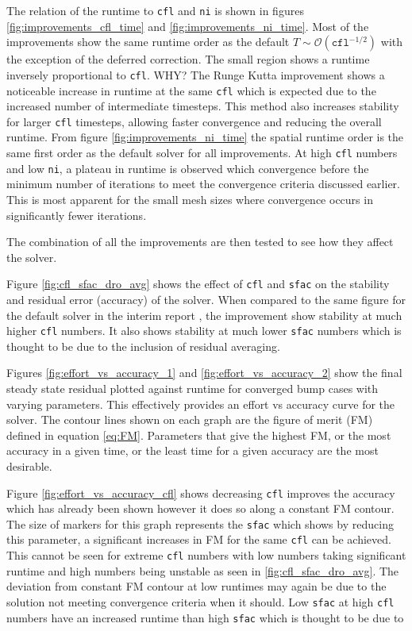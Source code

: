 \documentclass{article}
\begin{document}
The relation of the runtime to \texttt{cfl} and \texttt{ni} is shown in figures \ref{fig:improvements_cfl_time} and \ref{fig:improvements_ni_time}.
Most of the improvements show the same runtime order as the default $T\sim\mathcal{O}(\texttt{cfl}^{-1/2})$ with the exception of the deferred correction.
The small region shows a runtime inversely proportional to \texttt{cfl}. WHY? %
The Runge Kutta improvement shows a noticeable increase in runtime at the same \texttt{cfl} which is expected due to the increased number of intermediate timesteps.
This method also increases stability for larger \texttt{cfl} timesteps, allowing faster convergence and reducing the overall runtime.
From figure \ref{fig:improvements_ni_time} the spatial runtime order is the same first order as the default solver for all improvements.
At high \texttt{cfl} numbers and low \texttt{ni}, a plateau in runtime is observed which convergence before the minimum number of iterations to meet the convergence criteria discussed earlier.
This is most apparent for the small mesh sizes where convergence occurs in significantly fewer iterations.


The combination of all the improvements are then tested to see how they affect the solver.

Figure \ref{fig:cfl_sfac_dro_avg} shows the effect of \texttt{cfl} and \texttt{sfac} on the stability and residual error (accuracy) of the solver.
When compared to the same figure for the default solver in the interim report \cite{interim}, the improvement show stability at much higher \texttt{cfl} numbers.
It also shows stability at much lower \texttt{sfac} numbers which is thought to be due to the inclusion of residual averaging.

Figures \ref{fig:effort_vs_accuracy_1} and \ref{fig:effort_vs_accuracy_2} show the final steady state residual plotted against runtime for converged bump cases with varying parameters.
This effectively provides an effort vs accuracy curve for the solver.
The contour lines shown on each graph are the figure of merit (FM) defined in equation \ref{eq:FM}.
Parameters that give the highest FM, or the most accuracy in a given time, or the least time for a given accuracy are the most desirable.

Figure \ref{fig:effort_vs_accuracy_cfl} shows decreasing \texttt{cfl} improves the accuracy which has already been shown however it does so along a constant FM contour.
The size of markers for this graph represents the \texttt{sfac} which shows by reducing this parameter, a significant increases in FM for the same \texttt{cfl} can be achieved.
This cannot be seen for extreme \texttt{cfl} numbers with low numbers taking significant runtime and high numbers being unstable as seen in \ref{fig:cfl_sfac_dro_avg}.
The deviation from constant FM contour at low runtimes may again be due to the solution not meeting convergence criteria when it should.
Low \texttt{sfac} at high \texttt{cfl} numbers have an increased runtime than high \texttt{sfac} which is thought to be due to %
\end{document}
